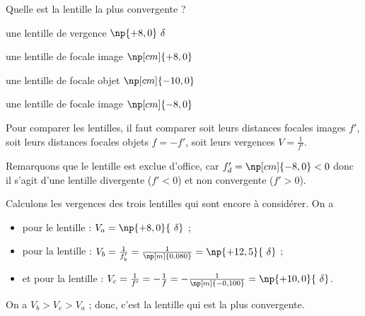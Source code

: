 \hauteurLargeurCadreReponse		{8mm}{1.0cm}
\initialisationEntrainement

\debutEntrainement


\begin{enonce}
Quelle est la lentille la plus convergente ?

	\begin{listeQCM2Colonnes}
	\item une lentille de vergence $\np{+8,0}\ \delta$
	\item une lentille de focale image $\np[cm]{+8,0}$
	\item une lentille de focale objet $\np[cm]{-10,0}$
	\item une lentille de focale image $\np[cm]{-8,0}$
	\end{listeQCM2Colonnes}
\end{enonce}

\reponse{\reponseB{}}

\begin{corrige}
Pour comparer les lentilles, il faut comparer soit leurs distances focales images $f'$, soit leurs distances focales objets $f=-f'$, soit leurs vergences $V=\frac{1}{f'}$. 

Remarquons que le lentille \reponseD{} est exclue d'office, car $f'_d=\np[cm]{-8,0}<0$ donc il s'agit d'une lentille divergente ($f'<0$) et non convergente ($f'>0$). 

Calculons les vergences des trois lentilles qui sont encore à considérer. On a 
\begin{itemize}
\item pour le lentille \reponseA{} : $V_a=\np{+8,0}{\ \delta}$ ;
\item pour la lentille \reponseB{} : $V_b=\frac{1}{f'_b}=\frac{1}{\np[m]{0,080}}=\np{+12,5}{\ \delta}$ ; 
\item et pour la lentille \reponseC{} : $V_c=\frac{1}{f'}=-\frac{1}{f}=-\frac{1}{\np[m]{-0,100}}=\np{+10,0}{\ \delta}$.
\end{itemize}

On a $V_b>V_c>V_a$ ; donc, c'est la lentille \reponseB{} qui est la plus convergente.
\end{corrige}

